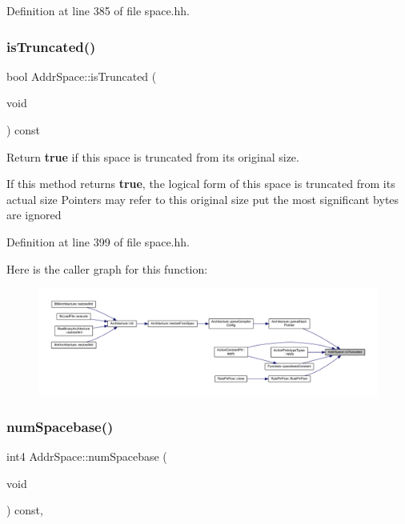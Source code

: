 Definition at line 385 of file space.\+hh.

\mbox{\label{class_addr_space_a06ef47bec774e59d14ab721eef35e315}} 
\subsubsection{\texorpdfstring{isTruncated()}{isTruncated()}}
{\footnotesize\ttfamily bool Addr\+Space\+::is\+Truncated (\begin{DoxyParamCaption}\item[{void}]{ }\end{DoxyParamCaption}) const\hspace{0.3cm}{\ttfamily [inline]}}



Return {\bfseries{true}} if this space is truncated from its original size. 

If this method returns {\bfseries{true}}, the logical form of this space is truncated from its actual size Pointers may refer to this original size put the most significant bytes are ignored 

Definition at line 399 of file space.\+hh.

Here is the caller graph for this function\+:
\nopagebreak
\begin{figure}[H]
\begin{center}
\leavevmode
\includegraphics[width=350pt]{class_addr_space_a06ef47bec774e59d14ab721eef35e315_icgraph}
\end{center}
\end{figure}
\mbox{\label{class_addr_space_a1bc0bc963f33dedb721489497a92c2e3}} 
\subsubsection{\texorpdfstring{numSpacebase()}{numSpacebase()}}
{\footnotesize\ttfamily int4 Addr\+Space\+::num\+Spacebase (\begin{DoxyParamCaption}\item[{void}]{ }\end{DoxyParamCaption}) const\hspace{0.3cm}{\ttfamily [inline]}, {\ttfamily [virtual]}}



